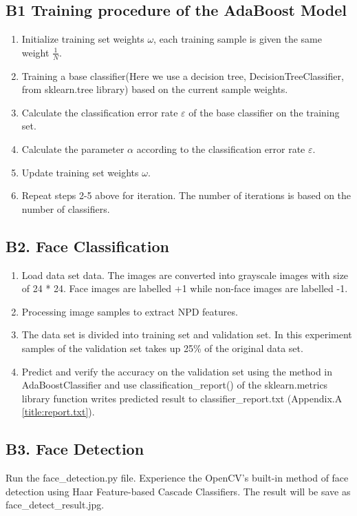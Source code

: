 \documentclass[journal, a4paper, onecolumn]{IEEEtran}
\begin{document}
\begin{multicols}{2}
\subsection*{B1 Training procedure of the AdaBoost Model}
    \begin{enumerate}
\item Initialize training set weights $\omega$, each training sample is given the same weight $\frac{1}{N}$. 
\item Training a base classifier(Here we use a decision tree, DecisionTreeClassifier, from sklearn.tree library) based on the current sample weights. 
\item Calculate the classification error rate $\varepsilon$ of the base classifier on the training set. 
\item Calculate the parameter $\alpha$ according to the classification error rate $\varepsilon$. 
\item Update training set weights $\omega$. 
\item Repeat steps 2-5 above for iteration. The number of iterations is based on the number of classifiers. 
    \end{enumerate}

\subsection*{B2. Face Classification}
      \begin{enumerate}
\item Load data set data. The images are converted into grayscale images with size of 24 * 24. Face images are labelled +1 while non-face images are labelled -1.
\item Processing image samples to extract NPD features.
\item The data set is divided into training set and validation set. In this experiment samples of the validation set takes up 25\% of the original data set. 
\item Predict and verify the accuracy on the validation set using the method in AdaBoostClassifier and use classification\_report() of the sklearn.metrics library function writes predicted result to classifier\_report.txt (Appendix.A \ref{title:report.txt}). \label{step:face_clf_4}
      \end{enumerate}

      \subsection*{B3. Face Detection}
Run the face\_detection.py file. Experience the OpenCV's built-in method of face detection using Haar Feature-based Cascade Classifiers. The result will be save as face\_detect\_result.jpg.


\end{multicols}
\end{document}
